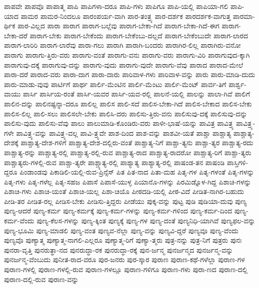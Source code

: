{ಪಾಪವೇ
ಪಾಪವೊ
ಪಾಪಾತ್ಮ
ಪಾಪಿ
ಪಾಪಿಗಳಾ-ದರೂ
ಪಾಪಿ-ಗಳು
ಪಾಪಿಗೂ
ಪಾಪಿ-ಯಲ್ಲಿ
ಪಾಪಿಯಾ-ಗಲಿ
ಪಾಪಿ-ಯಾದ
ಪಾಮರ
ಪಾಮರ-ನಿಂದಲೂ
ಪಾರಂಪರ್ಯ-ವಾಗಿ
ಪಾರ-ತಂತ್ರ್ಯ
ಪಾರ-ದರ್ಶಕ
ಪಾರದರ್ಶಕ-ವಾಗುತ್ತ
ಪಾರಮಾ-ರ್ಥಿಕ
ಪಾರ-ವಿಲ್ಲದ
ಪಾರಾ
ಪಾರಾಗ
ಪಾರಾಗ-ಬಲ್ಲೆವು
ಪಾರಾಗ-ಬೇಕಾ-ಗಿದೆ
ಪಾರಾಗ-ಬೇಕಾ-ಗಿದೆ-ಈಗ
ಪಾರಾಗ-ಬೇಕಾ-ದರೆ
ಪಾರಾಗ-ಬೇಕು
ಪಾರಾಗ-ಬೇಕೆಂದು
ಪಾರಾಗ-ಬೇಕೆಂಬು-ದಲ್ಲದೆ
ಪಾರಾಗ-ಬೇಕೆಂಬುದೇ
ಪಾರಾಗ-ಲಾರದ
ಪಾರಾಗ-ಲಾರಿರಿ
ಪಾರಾಗ-ಲಾರೆವು
ಪಾರಾ-ಗಲು
ಪಾರಾಗಿ
ಪಾರಾಗಿ-ಬಂದರು
ಪಾರಾಗಿರ-ಲಿಲ್ಲ
ಪಾರಾಗಿರು-ವನೋ
ಪಾರಾಗು
ಪಾರಾಗು-ತ್ತಿರು-ವರು
ಪಾರಾಗು-ವಂತೆ
ಪಾರಾಗು-ವನು
ಪಾರಾಗು-ವರು
ಪಾರಾಗು-ವಿರಿ
ಪಾರಾಗುವುದ-ಕ್ಕಾಗಿ
ಪಾರಾಗುವು-ದಕ್ಕೆ
ಪಾರಾಗುವು-ದನ್ನು
ಪಾರಾಗು-ವುದು
ಪಾರಾಗು-ವುದೇ
ಪಾರಾಗು-ವೆವು
ಪಾರಾದ
ಪಾರಾದ-ಮೇಲೆ
ಪಾರಾ-ದರೆ
ಪಾರಾದ-ವರು
ಪಾರಾ-ದಾಗ
ಪಾರಾ-ದಾರು
ಪಾರಿವಾಳ-ಗಳು
ಪಾರಿವಾಳ-ವನ್ನು
ಪಾರು
ಪಾರು-ಮಾಡಿ-ದುದು
ಪಾರು-ಮಾಡು-ವುವು
ಪಾರ್ಟಿಗೆ
ಪಾರ್ಥ
ಪಾರ್ಲಿ-ಮೆಂಟಿನ
ಪಾರ್ಲಿ-ಮೆಂಟು
ಪಾರ್ಲಿ-ಮೆಂಟ್
ಪಾರ್ವ-ತಿಗೆ
ಪಾರ್ಶ್ವ-ವಾಯು
ಪಾರ್ಸಿ
ಪಾರ್ಸಿಯ-ರಂತೆ
ಪಾರ್ಸಿ-ಯವರ
ಪಾರ್ಸಿ-ಯವ-ರಲ್ಲಿ
ಪಾಲನೆ-ಯಲ್ಲಿ
ಪಾಲನ್ನು
ಪಾಲಾ-ಗಿವೆ
ಪಾಲಿಗೆ
ಪಾಲಿನ-ದನ್ನು
ಪಾಲಿನಷ್ಟನ್ನಾ-ದರೂ
ಪಾಲಿಲ್ಲ
ಪಾಲಿಸ
ಪಾಲಿ-ಸದೆ
ಪಾಲಿಸ-ಬೇಕಾ-ಗಿದೆ
ಪಾಲಿಸ-ಬೇಕಾದ
ಪಾಲಿಸ-ಬೇಕು
ಪಾಲಿಸ-ಲಿಲ್ಲ
ಪಾಲಿ-ಸಲು
ಪಾಲಿಸಲೇ-ಬೇಕು
ಪಾಲಿಸಿ-ದರು
ಪಾಲಿಸು-ತ್ತಿರು-ವನು
ಪಾಲಿಸುವು-ದಕ್ಕೆ
ಪಾಲಿಸುವು-ದನ್ನು
ಪಾಲಿಸು-ವುದು
ಪಾಲಿಸು-ವೆವು
ಪಾಲು
ಪಾಲುಮಾಡಿ-ಕೊಂಡಿರು-ವರು
ಪಾಳೀ-ಭಾಷೆ-ಯನ್ನು
ಪಾವಿತ್ರ
ಪಾವಿತ್ರ್ಯ
ಪಾವಿತ್ರ್ಯ-ಗಳೇ
ಪಾವಿತ್ರ್ಯ-ವನ್ನು
ಪಾವಿತ್ರ್ಯ-ವಲ್ಲ
ಪಾವಿ-ತ್ರ್ಯವೇ
ಪಾಶ-ದಿಂದ
ಪಾಶ-ವನ್ನು
ಪಾಶವೀ-ಯತೆ
ಪಾಶ್ಚಾ
ಪಾಶ್ಚಾತ್ಯ
ಪಾಶ್ಚಾತ್ಯ-ದೇಶಕ್ಕೆ
ಪಾಶ್ಚಾತ್ಯ-ದೇಶ-ಗಳಿಗೆ
ಪಾಶ್ಚಾತ್ಯ-ದೇಶ-ದಲ್ಲಿರು-ವಂತೆ
ಪಾಶ್ಚಾತ್ಯ-ನಿಗೆ
ಪಾಶ್ಚಾ-ತ್ಯನು
ಪಾಶ್ಚಾ-ತ್ಯರ
ಪಾಶ್ಚಾತ್ಯ-ರದು
ಪಾಶ್ಚಾತ್ಯ-ರನ್ನು
ಪಾಶ್ಚಾತ್ಯ-ರಲ್ಲಿ
ಪಾಶ್ಚಾತ್ಯ-ರಲ್ಲಿ-ರುವ
ಪಾಶ್ಚಾತ್ಯ-ರಾದ
ಪಾಶ್ಚಾತ್ಯ-ರಾದರೋ
ಪಾಶ್ಚಾತ್ಯ-ರಿಗೆ
ಪಾಶ್ಚಾ-ತ್ಯರು
ಪಾಶ್ಚಾತ್ಯರು-ಗಳಲ್ಲಿ-ರುವ
ಪಾಶ್ಚಾ-ತ್ಯರೇ
ಪಾಶ್ಚ್ಯಾತ್ಯ-ರಲ್ಲಿ
ಪಾಶ್ಯಾತ್ಯ
ಪಾಶ್ಯಾತ್ಯ-ರಲ್ಲಿ
ಪಾಷಂಡ-ತನ
ಪಾಷಂಡಿ
ಪಾಸ್ತಿಗಳಿ-ದ್ದರೂ
ಪಿಂಡಾಂಡವು
ಪಿಕಾಡಿಲಿ-ಯಲ್ಲಿ-ರುವ-ಪ್ರಿನ್ಸೆಸ್
ಪಿತ
ಪಿತ-ನಾದ
ಪಿತಾ-ಮಹ
ಪಿತೃ-ಗಳ
ಪಿತೃ-ಗಳಂತೆ
ಪಿತೃ-ಗಳನ್ನು
ಪಿತೃ-ಗಳು
ಪಿತೃ-ಗಳೆಲ್ಲ
ಪಿತೃ-ಸಹಜ
ಪಿಪಾಸೆ
ಪಿಪಾಸೆ-ಯುಳ್ಳ
ಪಿಯಾನೊ-ಗಳನ್ನು
ಪಿರಮಿಡ್ನೊಳ-ಗಿದ್ದ
ಪಿಶಾಚಿ-ಗಳನ್ನು
ಪಿಶಾಚಿ-ಗಳು
ಪಿಶಾಚಿ-ಯಂತೆ
ಪಿಶಾಚಿ-ಯಲ್ಲ
ಪಿಶಾ-ಚಿಯೊ
ಪೀಠದಡಿ-ಯಲ್ಲಿ
ಪೀಠ-ವಿದೆ
ಪೀಡಿತ-ನಾಗಿರ-ಬಹುದು
ಪೀಡಿ-ತರ
ಪೀಡಿತ-ರಲ್ಲ
ಪೀಡಿಸ-ಬೇಕು
ಪೀಡಿಸು-ತ್ತಿದ್ದರು
ಪೀಡೆಯು
ಪುಕ್ಕ-ವನ್ನು
ಪುಟ್ಟ
ಪುಡಿ
ಪುಡಿಯಾ-ದುವು
ಪುಣ್ಯ
ಪುಣ್ಯ-ಆದರೆ
ಪುಣ್ಯ-ಕರ್ಮ
ಪುಣ್ಯ-ಕರ್ಮಕ್ಕೆ
ಪುಣ್ಯ-ಕರ್ಮ-ಗಳನ್ನು
ಪುಣ್ಯ-ಕರ್ಮ-ಗಳಿಂದ
ಪುಣ್ಯ-ಕರ್ಮ-ದಿಂದ
ಪುಣ್ಯ-ಕರ್ಮ-ವೆಂದು
ಪುಣ್ಯ-ಕೆಲಸ-ಗಳನ್ನು
ಪುಣ್ಯ-ಕ್ಕಿಂತ
ಪುಣ್ಯಕ್ಕೆ
ಪುಣ್ಯ-ಗಳ
ಪುಣ್ಯ-ದಂತೆ
ಪುಣ್ಯನಿಧಿ-ಯಾಗಿವೆ
ಪುಣ್ಯಫಲ-ವನ್ನು
ಪುಣ್ಯ-ಭೂಮಿ
ಪುಣ್ಯ-ಮಾಡಲಿ
ಪುಣ್ಯ-ವಂತ
ಪುಣ್ಯವ-ನೆಲ್ಲಾ
ಪುಣ್ಯ-ವನ್ನು
ಪುಣ್ಯವಿ-ದ್ದರೆ
ಪುಣ್ಯವೂ
ಪುಣ್ಯ-ವೆಂದು
ಪುಣ್ಯವೊ
ಪುಣ್ಯಾತ್ಮ
ಪುಣ್ಯಾತ್ಮ-ನಾಗಲಿ-ಎಲ್ಲರೂ
ಪುಣ್ಯಾತ್ಮ-ರಿಗೆ
ಪುಣ್ಯಾ-ತ್ಮರು
ಪುತ್ರ-ನನ್ನು
ಪುತ್ರ-ನಿಗೆ
ಪುತ್ರರು
ಪುನಃ
ಪುನರಾ-ವೃತ್ತಿ
ಪುನರುತ್ಥಾ-ನದ
ಪುನರುದ್ಧಾ-ರಕ
ಪುನರುದ್ಧಾ-ರಕ್ಕೆ
ಪುನ-ರ್ಜನ್ಮ
ಪುನರ್ಜನ್ಮದ
ಪುನರ್ಜನ್ಮ-ವನ್ನು
ಪುನರ್ಜನ್ಮ-ವೆಂಬುದು
ಪುನೀತ-ರಾದ-ವರೂ
ಪುರ-ಜನರು
ಪುರ-ಸ್ಕಾರ
ಪುರಾಣ
ಪುರಾಣ-ಕಥೆ-ಗಳೆಲ್ಲಾ
ಪುರಾಣ-ಗಳ
ಪುರಾಣ-ಗಳಲ್ಲಿ
ಪುರಾಣ-ಗಳಲ್ಲಿ-ರುವ
ಪುರಾಣ-ಗಳಲ್ಲೂ
ಪುರಾಣ-ಗಳಿಗೂ
ಪುರಾಣ-ಗಳು
ಪುರಾ-ಣದ
ಪುರಾಣ-ದಲ್ಲಿ
ಪುರಾಣ-ದಲ್ಲಿ-ರುವ
ಪುರಾಣ-ವನ್ನು
}
